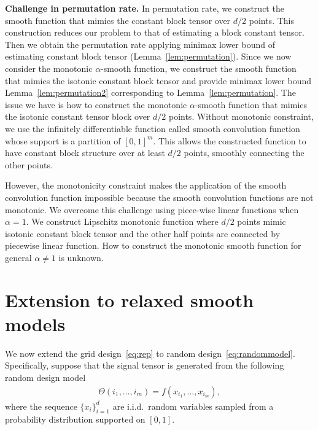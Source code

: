 \documentclass[12pt]{article}
\theoremstyle{definition}
\begin{document}
{{\bf Challenge in permutation rate.} In permutation rate, we construct the smooth function that mimics the constant block tensor over $d/2$ points. This construction reduces our problem to  that of estimating a block constant tensor. Then we obtain the permutation rate applying minimax lower bound of estimating constant block tensor (Lemma~\ref{lem:permutation}). Since we now consider the monotonic $\alpha$-smooth function, we construct the smooth function that mimics the isotonic constant block tensor and provide minimax lower bound  Lemma~\ref{lem:permutation2} corresponding to Lemma~\ref{lem:permutation}. The issue we have is how to construct the monotonic $\alpha$-smooth function that mimics the isotonic constant tensor block over $d/2$ points. Without monotonic constraint, we use the infinitely differentiable function called smooth convolution function whose support is a partition of $[0,1]^m$. This allows the constructed function to have constant block structure over at least $d/2$ points, smoothly connecting the other points. 

However, the monotonicity constraint makes the application of the smooth convolution function impossible because the smooth convolution functions are not monotonic. We overcome this challenge using piece-wise linear functions when $\alpha = 1$.
We construct Lipschitz monotonic function where $d/2$ points mimic isotonic constant block tensor and the other half points are connected by piecewise linear function. How to construct the monotonic smooth function for general $\alpha \neq 1$ is unknown.


\section{Extension to relaxed smooth models}\label{sec:rdesign}
We now extend the grid design~\eqref{eq:rep} to random design~\eqref{eq:randommodel}. Specifically, suppose that the signal tensor is generated from the following random design model
    \begin{align}\label{eq:random}
        \Theta(i_1,\ldots,i_m) = f(x_{i_1},\ldots,x_{i_m}),
    \end{align}
    where the sequence $\{x_i\}_{i=1}^d$ are i.i.d.\ random variables sampled from a probability distribution supported on $[0,1]$.
    
}
\end{document}
